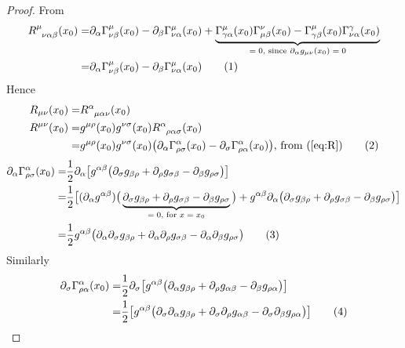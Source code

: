 \documentclass[]{article}
\newcommand\numberthis{\addtocounter{equation}{1}\tag{\theequation}}
\begin{document}
\begin{proof}
	From \cite[(53)]{akhmedev2016}
	\begin{align*}
	R\indices{^{\mu}_{\nu\alpha\beta}}(x_0) =& \partial_{\alpha}\Gamma^{\mu}_{\nu\beta}(x_0) - \partial_{\beta}\Gamma^{\mu}_{\nu\alpha}(x_0) + \underbrace{\Gamma^{\mu}_{\gamma\alpha}(x_0)\Gamma^{\nu}_{\mu\beta}(x_0)-\Gamma^{\mu}_{\gamma\beta}(x_0) \Gamma^{\gamma}_{\nu\alpha}(x_0)}_\text{$=0$, since $\partial_{\alpha}g_{\mu\nu}(x_0)=0$}\\
	=& \partial_{\alpha}\Gamma^{\mu}_{\nu\beta}(x_0) - \partial_{\beta}\Gamma^{\mu}_{\nu\alpha}(x_0) \numberthis\label{eq_rdef}
	\end{align*}
	Hence
	\begin{align*}
	R_{\mu\nu}(x_0) =&R\indices{^{\alpha}_{\mu\alpha\nu}}(x_0)\\
	R^{\mu\nu}(x_0)=& g^{\mu\rho}(x_0)g^{\nu\sigma}(x_0) R\indices{^{\alpha}_{\rho\alpha\sigma}}(x_0)\\
	=&g^{\mu\rho}(x_0)g^{\nu\sigma}(x_0)\big(\partial_{\alpha}\Gamma^{\alpha}_{\rho\sigma}(x_0) - \partial_{\sigma}\Gamma^{\alpha}_{\rho\alpha}(x_0) \big) \text{, from (\ref{eq:R})} \numberthis\label{eq:RR}
	\end{align*}
	\begin{align*}
	\partial_{\alpha}\Gamma^{\alpha}_{\rho\sigma}(x_0) =& \frac{1}{2}\partial_{\alpha}\big[g^{\alpha\beta}\big(\partial_{\sigma}g_{\beta\rho} + \partial_{\rho} g_{\sigma\beta} - \partial_{\beta} g_{\rho\sigma}\big)\big]\\
	 =& \frac{1}{2}\big[ (\partial_{\alpha}g^{\alpha\beta})\big(\underbrace{\partial_{\sigma}g_{\beta\rho} + \partial_{\rho} g_{\sigma\beta} - \partial_{\beta}g_{\rho\sigma}}_\text{$=0$, for $x=x_0$}\big) + g^{\alpha\beta}\partial_{\alpha}\big(\partial_{\sigma}g_{\beta\rho} + \partial_{\rho} g_{\sigma\beta} - \partial_{\beta}g_{\rho\sigma}\big) \big]\\
	 =& \frac{1}{2} g^{\alpha\beta}\big(\partial_{\alpha}\partial_{\sigma}g_{\beta\rho} + \partial_{\alpha}\partial_{\rho} g_{\sigma\beta} - \partial_{\alpha}\partial_{\beta}g_{\rho\sigma}\big) \numberthis\label{eq:D1}
	 \end{align*}
	 Similarly
	 \begin{align*} \partial_{\sigma}\Gamma^{\alpha}_{\rho\alpha}(x_0) =& \frac{1}{2}\partial_{\sigma}\big[g^{\alpha\beta}\big(\partial_{\alpha}g_{\beta\rho} + \partial_{\rho}g_{\alpha\beta} - \partial_{\beta}g_{\rho\alpha}\big)\big]\\
	 =& \frac{1}{2}\big[g^{\alpha\beta}\big(\partial_{\sigma}\partial_{\alpha}g_{\beta\rho} + \partial_{\sigma}\partial_{\rho}g_{\alpha\beta} - \partial_{\sigma}\partial_{\beta}g_{\rho\alpha}\big)\big] \numberthis\label{eq:D2}

\end{align*}
\end{proof}
\end{document}
